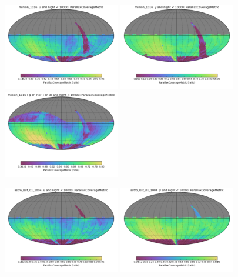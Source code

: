 \begin{figure}[ht]
  \begin{center}
  \includegraphics[width=2.0in]{./figs/milkyway/astromPanels/MW_Astrom_paCovge_Baseline_u_map.png}
  \includegraphics[width=2.0in]{./figs/milkyway/astromPanels/MW_Astrom_paCovge_Baseline_y_map.png}
  \includegraphics[width=2.0in]{./figs/milkyway/astromPanels/MW_Astrom_paCovge_Baseline_10y_map.png}
  \end{center}
  \begin{center}
  \includegraphics[width=2.0in]{./figs/milkyway/astromPanels/MW_Astrom_paCovge_wfdPlane_u_map.png}
  \includegraphics[width=2.0in]{./figs/milkyway/astromPanels/MW_Astrom_paCovge_wfdPlane_y_map.png}

\end{center}
\end{figure}
